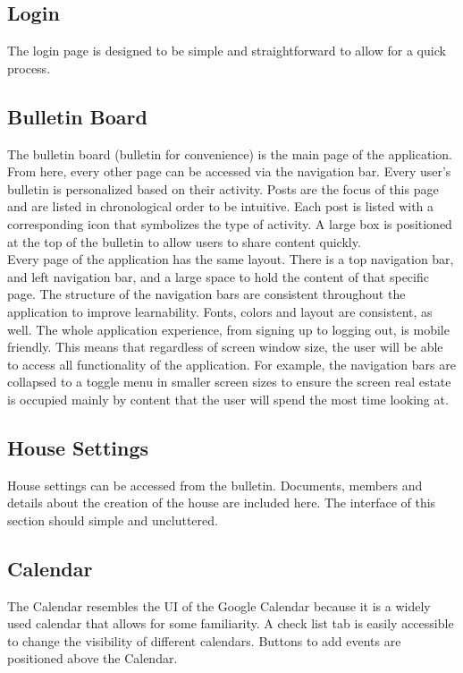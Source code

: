 \documentclass[12pt]{article}
\begin{document}
\subsection{Login}
The login page is designed to be simple and straightforward to allow for a quick process.

\subsection{Bulletin Board}
The bulletin board (bulletin for convenience) is the main page of the application. From here, every other page can be accessed via the navigation bar. Every user's bulletin is personalized based on their activity. Posts are the focus of this page and are listed in chronological order to be intuitive. Each post is listed with a corresponding icon that symbolizes the type of activity. A large box is positioned at the top of the bulletin to allow users to share content quickly. \\

\noindent Every page of the application has the same layout. There is a top navigation bar, and left navigation bar, and a large space to hold the content of that specific page. The structure of the navigation bars are consistent throughout the application to improve learnability. Fonts, colors and layout are consistent, as well. The whole application experience, from signing up to logging out, is mobile friendly. This means that regardless of screen window size, the user will be able to access all functionality of the application. For example, the navigation bars are collapsed to a toggle menu in smaller screen sizes to ensure the screen real estate is occupied mainly by content that the user will spend the most time looking at.

\subsection{House Settings}
House settings can be accessed from the bulletin. Documents, members and details about the creation of the house are included here. The interface of this section should simple and uncluttered.

\subsection{Calendar}
The Calendar resembles the UI of the Google Calendar because it is a widely used calendar that allows for some familiarity. A check list tab is easily accessible to change the visibility of different calendars. Buttons to add events are positioned above the Calendar.
\end{document}
